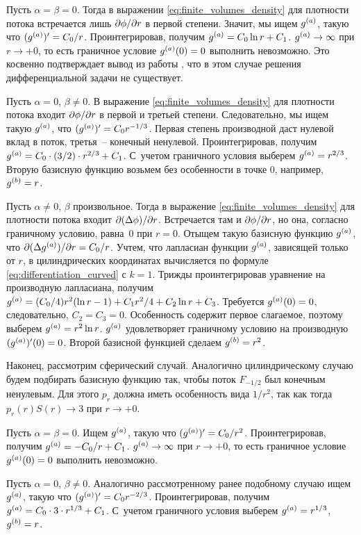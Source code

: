 Пусть $\alpha = \beta = 0$. Тогда в выражении \eqref{eq:finite_volumes_density} для плотности потока встречается лишь $\partial \phi / \partial r$ в первой степени. Значит, мы ищем ${g^{(a)}}$, такую что $(\ga)' \hm = C_0/r$. Проинтегрировав, получим ${g^{(a)}} = C_0 \ln r + C_1$. ${g^{(a)}} \to \infty$ при $r \to +0$, то есть граничное условие ${g^{(a)}}(0) = 0$ выполнить невозможно. Это косвенно подтверждает вывод из работы \cite{zipunova_higher_codimension}, что в этом случае решения дифференциальной задачи не существует.

Пусть $\alpha = 0$, $\beta \neq 0$. В выражение \eqref{eq:finite_volumes_density} для плотности потока входит $\partial \phi / \partial r$ в первой и третьей степени. Следовательно, мы ищем такую ${g^{(a)}}$, что $(\ga)' \hm = C_0 r^{-1/3}$. Первая степень производной даст нулевой вклад в поток, третья~-- конечный ненулевой. Проинтегрировав, получим ${g^{(a)}} = C_0 \cdot (3/2) \cdot r^{2/3} + C_1$. С~учетом граничного условия выберем ${g^{(a)}} = r^{2/3}$. Вторую базисную функцию возьмем без особенности в точке $0$, например, ${g^{(b)}} = r$.

Пусть $\alpha \neq 0$, $\beta$ произвольное. Тогда в выражение \eqref{eq:finite_volumes_density} для плотности потока входит $\partial (\Delta \phi) / \partial r$. Встречается там и $\partial \phi / \partial r$, но она, согласно граничному условию, равна~$0$ при $r = 0$. Отыщем такую базисную функцию ${g^{(a)}}$, что $\partial (\Delta {g^{(a)}}) / \partial r = C_0 / r$. Учтем, что лапласиан функции ${g^{(a)}}$, зависящей только от $r$, в цилиндрических координатах вычисляется по формуле \eqref{eq:differentiation_curved} с $k = 1$. Трижды проинтегрировав уравнение на производную лапласиана, получим ${g^{(a)}} = (C_0/4) r^2 (\ln r - 1) + C_1 r^2 / 4 + C_2 \ln r + C_3$. Требуется ${g^{(a)}}(0) = 0$, следовательно, $C_2 = C_3 = 0$. Особенность содержит первое слагаемое, поэтому выберем ${g^{(a)}} = r^2 \ln r$. ${g^{(a)}}$ удовлетворяет граничному условию на производную $({g^{(a)}})'(0) = 0$. Второй базисной функцией сделаем ${g^{(b)}} = r^2$.

Наконец, рассмотрим сферический случай. Аналогично цилиндрическому случаю будем подбирать базисную функцию так, чтобы поток $F_{-1/2}$ был конечным ненулевым. Для этого $p_r$ должна иметь особенность вида $1/r^2$, так как тогда $p_r(r) S(r) \to 3$ при $r \to +0$.

Пусть $\alpha = \beta = 0$. Ищем ${g^{(a)}}$, такую что $({g^{(a)}})' = C_0 / r^2$. Проинтегрировав, получим ${g^{(a)}} = -C_0 / r + C_1$. ${g^{(a)}} \to \infty$ при $r \to +0$, то есть граничное условие ${g^{(a)}}(0) = 0$ выполнить невозможно.

Пусть $\alpha = 0$, $\beta \neq 0$. Аналогично рассмотренному ранее подобному случаю ищем~${g^{(a)}}$, такую что $({g^{(a)}})' = C_0 r^{-2/3}$. Проинтегрировав, получим $\ga \hm = C_0 \cdot 3 \cdot r^{1/3} + C_1$. С~учетом граничного условия выберем ${g^{(a)}} = r^{1/3}$, ${g^{(b)}} = r$.

